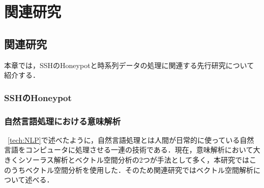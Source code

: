 \chapter{関連研究}
 \label{rela}

\section{関連研究}
本章では，SSHのHoneypotと時系列データの処理に関連する先行研究について紹介する．
\subsection{SSHのHoneypot}
\subsection{自然言語処理における意味解析}
~\ref{tech:NLP}で述べたように，自然言語処理とは人間が日常的に使っている自然言語をコンピュータに処理させる一連の技術である．現在，意味解析において大きくシソーラス解析とベクトル空間分析の2つが手法として多く，本研究ではこのうちベクトル空間分析を使用した．そのため関連研究ではベクトル空間解析について述べる．

